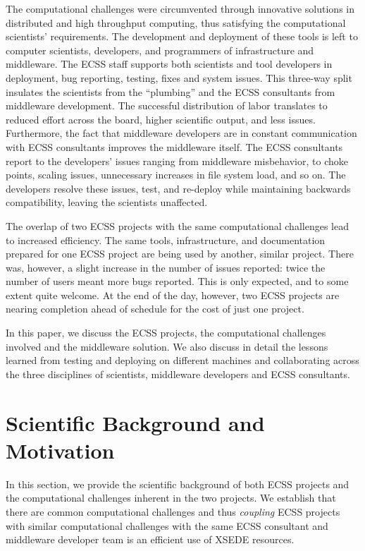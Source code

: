 \documentclass{sig-alternate}
\begin{document}
The computational challenges were circumvented through innovative solutions in
distributed and high throughput computing, thus satisfying the computational
scientists' requirements. The development and deployment of these tools is left
to computer scientists, developers, and programmers of infrastructure and
middleware. The ECSS staff supports both scientists and tool developers in
deployment, bug reporting, testing, fixes and system issues. This three-way
split insulates the scientists from the ``plumbing'' and the ECSS consultants
from middleware development. The successful distribution of labor translates
to reduced effort across the board, higher scientific output, and less issues.
Furthermore, the fact that middleware developers are in constant communication
with ECSS consultants improves the middleware itself. The ECSS consultants
report to the developers' issues ranging from middleware misbehavior,
to choke points, scaling issues, unnecessary increases in file system load, and so
on. The developers resolve these issues, test, and re-deploy while maintaining
backwards compatibility, leaving the scientists unaffected.

The overlap of two ECSS projects with the same computational challenges lead to
increased efficiency. The same tools, infrastructure, and documentation prepared
for one ECSS project are being used by another, similar project. There was,
however, a slight increase in the number of issues reported: twice the number
of users meant more bugs reported. This is only expected, and to some extent
quite welcome. At the end of the day, however, two ECSS projects are nearing
completion ahead of schedule for the cost of just one project.

In this paper, we discuss the ECSS projects, the computational challenges
involved and the middleware solution. We also discuss in detail the lessons
learned from testing and deploying on different machines and collaborating
across the three disciplines of scientists, middleware developers and ECSS
consultants.



\section{Scientific Background and Motivation}

In this section, we provide the scientific background of both ECSS
projects and the computational challenges inherent in the two
projects. We establish that there are common computational challenges
and thus {\it coupling} ECSS projects with similar computational
challenges with the same ECSS consultant and middleware developer team
is an efficient use of XSEDE resources.
\end{document}
